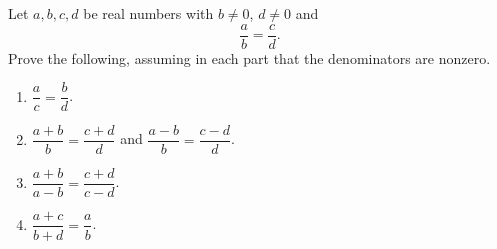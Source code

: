 Let $a,b,c,d$ be real numbers with $b\ne0$, $d\ne0$ and
\[\dfrac {a}{b}=\dfrac {c}{d}.\]
Prove the following, assuming in each part that the denominators are nonzero.
\begin{enumerate}
\item[(a)] $\dfrac {a}{c}=\dfrac {b}{d}$.
\item[(b)] $\dfrac{a+b}{b}=\dfrac{c+d}{d}$ and $\dfrac{a-b}{b}=\dfrac{c-d}{d}$.
\item[(c)] $\dfrac{a+b}{a-b}=\dfrac{c+d}{c-d}$.
\item[(d)] $\dfrac{a+c}{b+d}=\dfrac {a}{b}$.
\end{enumerate}
